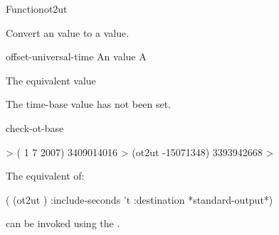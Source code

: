 \documentclass[10pt,twoside,english,pdftex]{article}
\begin{document}
\begin{functiondoc}{Function}{ot2ut}{
    }
%

\fnsyntax

\fnpurpose Convert an  value to a  value.

\fnpackage {}

\fnmodule {}

\fnargs
\begin{args}{offset-universal-time}
 An  value
 A 
\end{args}

\fnreturns The equivalent  value

\fnerrors The  time-base value has not been set.

\begin{alsos}{check-ot-base}
\also[*ot-base*]
\also[ut2ot]
\end{alsos}

\fnexample
%
\W\supp
\begin{example}
  > ( 1 7 2007)
  3409014016
  > (ot2ut -15071348)
  3393942668
  >
\end{example}

\replnote 
%
%
%
The equivalent of:
%
\W\supp
\begin{example}
  ( (ot2ut ) 
     :include-seconds 't
     :destination *standard-output*)
\end{example} 
%
can be invoked using the  .

\end{functiondoc}

\end{document}
